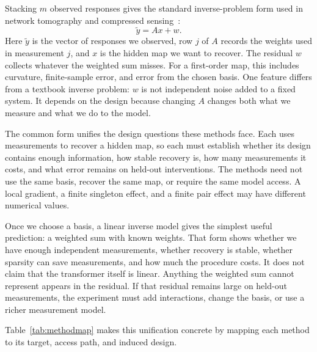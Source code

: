 \documentclass[sigconf,10pt,nonacm,balance=false]{acmart}
\begin{document}
Stacking $m$ observed responses gives the standard inverse-problem form used in network tomography and compressed sensing~\cite{vardi1996tomo,candes2006robust,firooz2010cs}:
\begin{equation*}
    \widetilde y = A x + w. \tag{MT}
\end{equation*}
Here $\widetilde y$ is the vector of responses we observed, row $j$ of $A$ records the weights used in measurement $j$, and $x$ is the hidden map we want to recover. The residual $w$ collects whatever the weighted sum misses. For a first-order map, this includes curvature, finite-sample error, and error from the chosen basis. One feature differs from a textbook inverse problem: $w$ is not independent noise added to a fixed system. It depends on the design because changing $A$ changes both what we measure and what we do to the model.

The common form unifies the design questions these methods face. Each uses measurements to recover a hidden map, so each must establish whether its design contains enough information, how stable recovery is, how many measurements it costs, and what error remains on held-out interventions. The methods need not use the same basis, recover the same map, or require the same model access. A local gradient, a finite singleton effect, and a finite pair effect may have different numerical values.

Once we choose a basis, a linear inverse model gives the simplest useful prediction: a weighted sum with known weights. That form shows whether we have enough independent measurements, whether recovery is stable, whether sparsity can save measurements, and how much the procedure costs. It does not claim that the transformer itself is linear. Anything the weighted sum cannot represent appears in the residual. If that residual remains large on held-out measurements, the experiment must add interactions, change the basis, or use a richer measurement model.

Table~\ref{tab:methodmap} makes this unification concrete by mapping each method to its target, access path, and induced design.
\end{document}
